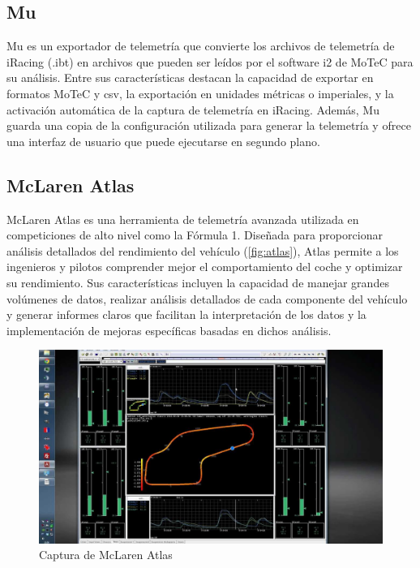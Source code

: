 \subsection{Mu}
Mu \cite{mu} es un exportador de telemetría que convierte los archivos de telemetría de iRacing (.ibt) en archivos que pueden ser leídos por el software i2 de MoTeC para su análisis. Entre sus características destacan la capacidad de exportar en formatos MoTeC y \ac{csv}, la exportación en unidades métricas o imperiales, y la activación automática de la captura de telemetría en iRacing. Además, Mu guarda una copia de la configuración utilizada para generar la telemetría y ofrece una interfaz de usuario que puede ejecutarse en segundo plano.

\subsection{McLaren Atlas}
McLaren Atlas \cite{atlas} es una herramienta de telemetría avanzada utilizada en competiciones de alto nivel como la Fórmula 1. Diseñada para proporcionar análisis detallados del rendimiento del vehículo (\autoref{fig:atlas}), Atlas permite a los ingenieros y pilotos comprender mejor el comportamiento del coche y optimizar su rendimiento. Sus características incluyen la capacidad de manejar grandes volúmenes de datos, realizar análisis detallados de cada componente del vehículo y generar informes claros que facilitan la interpretación de los datos y la implementación de mejoras específicas basadas en dichos análisis.

\begin{figure}[H]
	\centering
	\includegraphics[width=0.6\linewidth]{./figs/herramientas/analisis/mclaren_atlas.png}
	\caption[Captura de McLaren Atlas]{Captura de McLaren Atlas \cite{atlas_cap}}
    \label{fig:atlas}
\end{figure}

